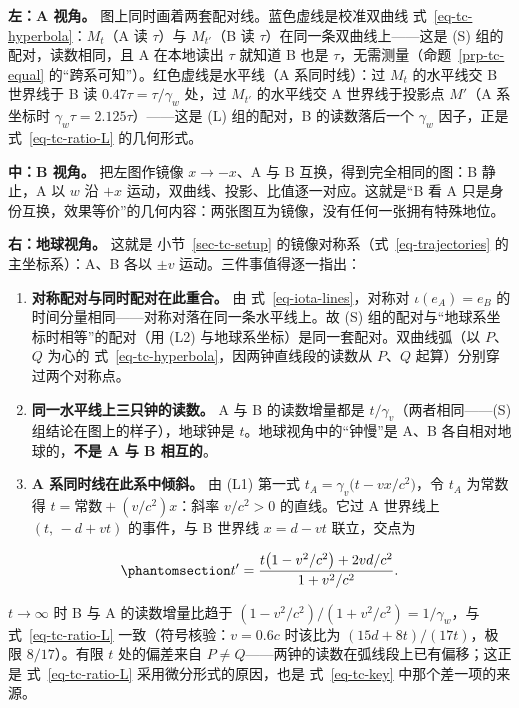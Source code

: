 \documentclass[
  chinese,
  a4paper,
  UTF8,
  12pt,
  oneside,
  openany]{ctexbook}
\providecommand{\tightlist}{%
  \setlength{\itemsep}{0pt}\setlength{\parskip}{0pt}}
\theoremstyle{plain}
\theoremstyle{plain}
\theoremstyle{plain}
\theoremstyle{definition}
\theoremstyle{plain}
\theoremstyle{plain}
\theoremstyle{remark}
\begin{document}
\textbf{左：A 视角。} 图上同时画着两套配对线。蓝色虚线是校准双曲线
式~\ref{eq-tc-hyperbola}：\(M_t\)（A 读 \(\tau\)）与 \(M_{t'}\)（B 读
\(\tau\)）在同一条双曲线上------这是 (S) 组的配对，读数相同，且 A
在本地读出 \(\tau\) 就知道 B 也是
\(\tau\)，无需测量（命题~\ref{prp-tc-equal}
的``跨系可知''）。红色虚线是水平线（A 系同时线）：过 \(M_t\) 的水平线交
B 世界线于 B 读 \(0.47\tau=\tau/\gamma_w\) 处，过 \(M_{t'}\) 的水平线交
A 世界线于投影点 \(M'\)（A 系坐标时
\(\gamma_w\tau=2.125\tau\)）------这是 (L) 组的配对，B 的读数落后一个
\(\gamma_w\) 因子，正是 式~\ref{eq-tc-ratio-L} 的几何形式。

\textbf{中：B 视角。} 把左图作镜像 \(x\to-x\)、A 与 B
互换，得到完全相同的图：B 静止，A 以 \(w\) 沿 \(+x\)
运动，双曲线、投影、比值逐一对应。这就是``B 看 A
只是身份互换，效果等价''的几何内容：两张图互为镜像，没有任何一张拥有特殊地位。

\textbf{右：地球视角。} 这就是 小节~\ref{sec-tc-setup}
的镜像对称系（式~\ref{eq-trajectories} 的主坐标系）：A、B 各以 \(\pm v\)
运动。三件事值得逐一指出：

\begin{enumerate}
\def\labelenumi{\arabic{enumi}.}
\tightlist
\item
  \textbf{对称配对与同时配对在此重合。} 由
  式~\ref{eq-iota-lines}，对称对 \(\iota(e_A)=e_B\)
  的时间分量相同------对称对落在同一条水平线上。故 (S)
  组的配对与``地球系坐标时相等''的配对（用 (L2)
  与地球系坐标）是同一套配对。双曲线弧（以 \(P\)、\(Q\) 为心的
  式~\ref{eq-tc-hyperbola}，因两钟直线段的读数从 \(P\)、\(Q\)
  起算）分别穿过两个对称点。
\item
  \textbf{同一水平线上三只钟的读数。} A 与 B 的读数增量都是
  \(t/\gamma_v\)（两者相同------(S) 组结论在图上的样子），地球钟是
  \(t\)。地球视角中的``钟慢''是 A、B 各自相对地球的，\textbf{不是 A 与 B
  相互的}。
\item
  \textbf{A 系同时线在此系中倾斜。} 由 (L1) 第一式
  \(t_A=\gamma_v\bigl(t-vx/c^{2}\bigr)\)，令 \(t_A\) 为常数得
  \(t=\text{常数}+(v/c^{2})x\)：斜率 \(v/c^{2}>0\) 的直线。它过 A
  世界线上 \((t,\,-d+vt)\) 的事件，与 B 世界线 \(x=d-vt\) 联立，交点为
\end{enumerate}

\begin{equation}\protect\phantomsection\label{eq-tc-tprime}{
t'=\frac{t\bigl(1-v^{2}/c^{2}\bigr)+2vd/c^{2}}{1+v^{2}/c^{2}}.
}\end{equation}

\(t\to\infty\) 时 B 与 A 的读数增量比趋于
\((1-v^{2}/c^{2})/(1+v^{2}/c^{2})=1/\gamma_w\)，与
式~\ref{eq-tc-ratio-L} 一致（符号核验：\(v=0.6c\) 时该比为
\((15d+8t)/(17t)\)，极限 \(8/17\)）。有限 \(t\) 处的偏差来自
\(P\neq Q\)------两钟的读数在弧线段上已有偏移；这正是
式~\ref{eq-tc-ratio-L} 采用微分形式的原因，也是 式~\ref{eq-tc-key}
中那个差一项的来源。
\end{document}
